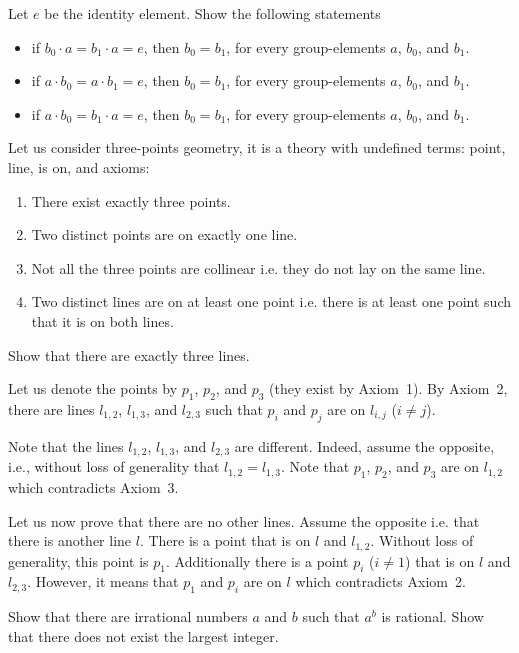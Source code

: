 \begin{chapterendexercises}
        Let $e$ be the identity element. Show the following statements
        \begin{itemize}
          \item if $b_0 \cdot a = b_1 \cdot a = e$, then $b_0 = b_1$, for every
            group-elements $a$, $b_0$, and $b_1$.
          \item if $a \cdot b_0 = a \cdot b_1 = e$, then $b_0 = b_1$, for every
            group-elements $a$, $b_0$, and $b_1$.
          \item if $a \cdot b_0 = b_1 \cdot a = e$, then $b_0 = b_1$, for every
            group-elements $a$, $b_0$, and $b_1$.
        \end{itemize}
    \exercise Let us consider three-points geometry, it is a theory with
        undefined terms: point, line, is on, and axioms:
        \begin{enumerate}
            \item There exist exactly three points.
            \item Two distinct points are on exactly one line.
            \item Not all the three points are collinear i.e. they do not lay on the
                same line.
            \item Two distinct lines are on at least one point i.e. there is at
              least one point such that it is on both lines.
        \end{enumerate}

        Show that there are exactly three lines.

        \begin{solution}
            Let us denote the points by $p_1$, $p_2$, and $p_3$ (they exist by
            Axiom~1). By Axiom~2, there are lines $l_{1, 2}$,
            $l_{1, 3}$, and $l_{2, 3}$ such that $p_i$ and $p_j$ are on
            $l_{i, j}$ ($i \neq j$).

            Note that the lines $l_{1, 2}$, $l_{1, 3}$, and $l_{2, 3}$ are different.
            Indeed, assume the opposite, i.e., without loss of generality that
            $l_{1, 2} = l_{1, 3}$. Note that $p_1$, $p_2$, and $p_3$ are on $l_{1, 2}$
            which contradicts Axiom~3.

            Let us now prove that there are no other lines. Assume the
            opposite i.e. that there is another line $l$. There is a
            point that is on $l$ and $l_{1, 2}$. Without loss of generality,
            this point is $p_1$. Additionally there is a point $p_i$
            ($i \neq 1$) that is on $l$ and  $l_{2, 3}$. However, it means that
            $p_1$ and $p_i$ are on $l$ which contradicts Axiom~2.
        \end{solution}
    \exercise Show that there are irrational numbers $a$ and $b$ such that
        $a^b$ is rational.
    \exercise[recommended] Show that there does not exist the largest integer.


\end{chapterendexercises}
